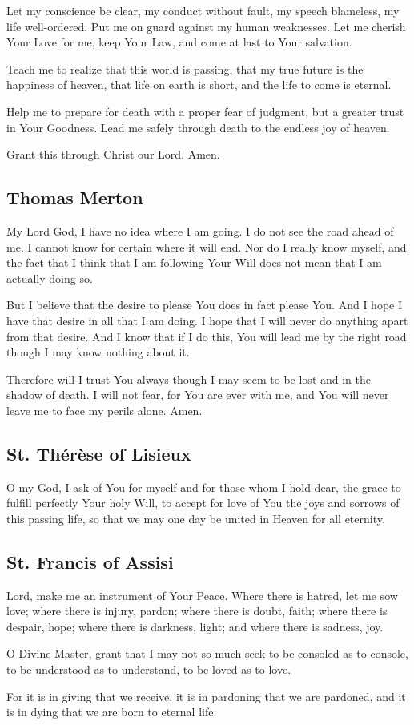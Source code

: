 \documentclass[12pt]{article}
\newcommand{\prayertitle}[1]{\subsection{#1}}
\begin{document}
Let my conscience be clear,
my conduct without fault,
my speech blameless,
my life well-ordered.
Put me on guard against my human weaknesses.
Let me cherish Your Love for me,
keep Your Law,
and come at last to Your salvation.

Teach me to realize that this world is passing,
that my true future is the happiness of heaven,
that life on earth is short,
and the life to come is eternal.

Help me to prepare for death with a proper fear of judgment, but a greater trust in Your Goodness.
Lead me safely through death to the endless joy of heaven.

Grant this through Christ our Lord. Amen.

\prayertitle{Thomas Merton}
My Lord God, I have no idea where I am going. 
I do not see the road ahead of me.
I cannot know for certain where it will end.
Nor do I really know myself,  and the fact that I think that I am following Your Will does not mean that I am actually doing so.

But I believe that the desire to please You does in fact please You. 
And I hope I have that desire in all that I am doing. 
I hope that I will never do anything apart from that desire. 
And I know that if I do this, You will lead me by the right road though I may know nothing about it.

Therefore will I trust You always though I may seem to be lost and in the shadow of death.
I will not fear, for You are ever with me, and You will never leave me to face my perils alone. 
Amen.  

\prayertitle{St. Th\'{e}r\`{e}se of Lisieux}
O my God, I ask of You for myself and for those whom I hold dear, the grace to fulfill perfectly Your holy Will, to accept for love of You the joys and sorrows of this passing life, so that we may one day be united in Heaven for all eternity.

\prayertitle{St. Francis of Assisi}
Lord, make me an instrument of Your Peace.
Where there is hatred, let me sow love;
where there is injury, pardon;
where there is doubt, faith;
where there is despair, hope;
where there is darkness, light;
and where there is sadness, joy.

O Divine Master, grant that I may not so much seek to be consoled as to console, to be understood as to understand, to be loved as to love.

For it is in giving that we receive, it is in pardoning that we are pardoned, and it is in dying that we are born to eternal life.
\end{document}
